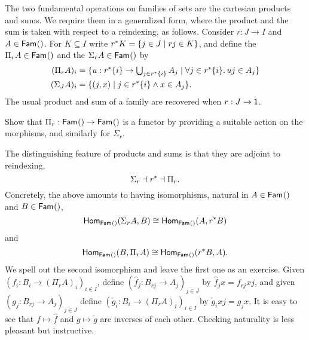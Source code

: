 The two fundamental operations on families of sets are the cartesian products and sums. We require them in a generalized form, where the product and the sum is taken with respect to a reindexing, as follows.
%
Consider $r : J \to I$ and $A \in \Fam{J}$. For $K \subseteq I$ write $\invim{r} K = \set{ j \in J \such r j \in K}$, and define the  $\Pi_r A \in \Fam{I}$ and the  $\Sigma_r A \in \Fam{I}$ by
%
\begin{align}
  \label{eq:pi-r}
  (\Pi_r A)_i &=
    \set{ u : \invim{r} \set{i} \to \textstyle\bigcup_{j \in \invim{r} \set{i}} A_j
            \such \all{j \in \invim{r} \set{i}} u j \in A_j
    }
  \\
  \notag
  (\Sigma_J A)_i &= \set{ (j, x) \such j \in \invim{r} \set{i} \land x \in A_j }.
\end{align}
%
The usual product and sum of a family are recovered when $r : J \to \one$.

\begin{exercise}
  Show that $\Pi_r : \Fam{J} \to \Fam{I}$ is a functor by providing a suitable action on the morphisms, and similarly for $\Sigma_r$.
\end{exercise}

The distinguishing feature of products and sums is that they are adjoint to reindexing,
%
\begin{equation*}
  \Sigma_r \dashv \invim{r} \dashv \Pi_r.
\end{equation*}
%
Concretely, the above amounts to having isomorphisms, natural in $A \in \Fam{J}$ and $B \in \Fam{I}$,
%
\begin{equation*}
  \Hom[\Fam{I}]{\Sigma_r A, B}
  \cong
  \Hom[\Fam{J}]{A, \invim{r} B}
\end{equation*}
%
and
%
\begin{equation*}
  \Hom[\Fam{I}]{B, \Pi_r A}
  \cong
  \Hom[\Fam{J}]{\invim{r} B, A}.
\end{equation*}
%
We spell out the second isomorphism and leave the first one as an exercise.
%
Given $(f_i : B_i \to (\Pi_r A)_i)_{i \in I}$, define $(\hat{f}_j : B_{r j} \to A_j)_{j \in J}$ by $\hat{f}_j x = f_{r j} x j$, and given $(g_j : B_{r j} \to A_j)_{j \in J}$ define $(\check{g}_i : B_i \to (\Pi_r A)_i)_{i \in I}$ by $\check{g}_i x j = g_j x$. It is easy to see that $f \mapsto \hat{f}$ and $g \mapsto \check{g}$ are inverses of each other. Checking naturality is less pleasant but instructive.

